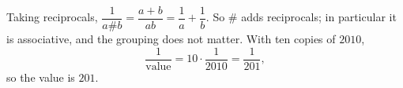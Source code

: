 Taking reciprocals, $\dfrac{1}{a\#b}=\dfrac{a+b}{ab}=\dfrac{1}{a}+\dfrac{1}{b}$. So $\#$ adds reciprocals; in particular it is associative, and the grouping does not matter. With ten copies of $2010$,
\[
\dfrac{1}{\text{value}}=10\cdot\dfrac{1}{2010}=\dfrac{1}{201},
\]
so the value is $\boxed{201}$.
